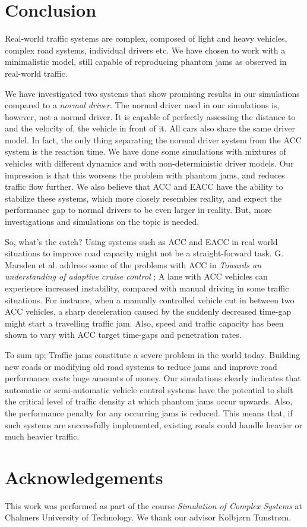 \section{Conclusion}
Real-world traffic systems are complex, composed of light and heavy vehicles,
complex road systems, individual drivers etc. We have chosen to work
with a minimalistic model, still capable of reproducing phantom jams as
observed in real-world traffic.

We have investigated two systems that show promising results in our
simulations compared to a \emph{normal driver}. The normal driver used in our
simulations is, however, not a normal driver. It is capable of perfectly assessing
the distance to and the velocity of, the vehicle in front of it. All cars also
share the same driver model. In fact, the only thing separating the normal
driver system from the ACC system is the reaction time. We have done some
simulations with mixtures of vehicles with different dynamics and with
non-deterministic driver models. Our impression is that this worsens the
problem with phantom jams, and reduces traffic flow further. We also believe
that ACC and EACC have the ability to stabilize these systems, which more closely
resembles reality, and expect the performance gap to normal drivers to be even
larger in reality. But, more investigations and simulations on the topic is
needed.

So, what's the catch? Using systems such as ACC and EACC in real world
situations to improve road capacity might not be a straight-forward task. G.
Marsden et al. address some of the problems with ACC in \emph{Towards an
understanding of adaptive cruise control} \cite{accCritics}; A lane with ACC
vehicles can experience increased instability, compared with manual driving
in some traffic situations. For instance, when a manually controlled vehicle
cut in between two ACC vehicles, a sharp deceleration caused by the suddenly
decreased time-gap might start a travelling traffic jam. Also, speed and
traffic capacity has been shown to vary with ACC target time-gaps and
penetration rates.

To sum up; Traffic jams constitute a severe problem in the world today.
Building new roads or modifying old road systems to reduce jams and improve
road performance costs huge amounts of money. Our simulations clearly
indicates that automatic or semi-automatic vehicle control systems have the
potential to shift the critical level of traffic density at which phantom jams
occur upwards. Also, the performance penalty for any occurring jams is
reduced. This means that, if such systems are successfully implemented,
existing roads could handle heavier or much heavier traffic.

\section*{Acknowledgements}
This work was performed as part of the course \emph{Simulation of Complex
Systems} at Chalmers University of Technology. We thank our advisor
Kolbj{\o}rn Tunstr{\o}m.

